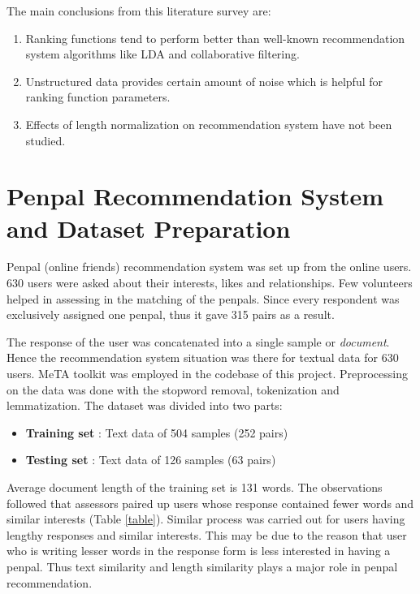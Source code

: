 \documentclass[11pt]{article}
\begin{document}
	The main conclusions from this literature survey are:
	
	\begin{enumerate}
		\item Ranking functions tend to perform better than well-known recommendation system algorithms like LDA and collaborative filtering.
		\item Unstructured data provides certain amount of noise which is helpful for ranking function parameters.
		\item Effects of length normalization on recommendation system have not been studied.
	\end{enumerate}
	
	\section{Penpal Recommendation System and Dataset Preparation}
	
	Penpal (online friends) recommendation system was set up from the online users. 630 users were asked about their interests, likes and relationships. Few volunteers helped in assessing in the matching of the penpals. Since every respondent was exclusively assigned one penpal, thus it gave 315 pairs as a result. 
	
	The response of the user was concatenated into a single sample or \textit{document}. Hence the recommendation system situation was there for textual data for 630 users. MeTA \cite{massung2016meta} toolkit was employed in the codebase of this project. Preprocessing on the data was done with the stopword removal, tokenization and lemmatization.  The dataset was divided into two parts:
	
	\begin{itemize}
		\item \textbf{Training set} : Text data of 504 samples (252 pairs)
		\item \textbf{Testing set} : Text data of 126 samples (63 pairs)
	\end{itemize}
	
	Average document length of the training set is 131 words. The observations followed that assessors paired up users whose response contained fewer words and similar interests (Table \ref{table}). Similar process was carried out for users having lengthy responses and similar interests. This may be due to the reason that user who is writing lesser words in the response form is less interested in having a penpal. Thus text similarity and length similarity plays a major role in penpal recommendation.
	
\end{document}
